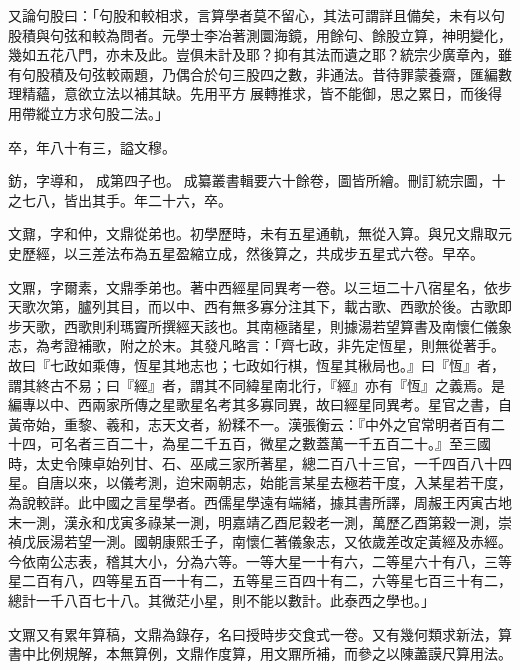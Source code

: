 \begin{pinyinscope}
又論句股曰：「句股和較相求，言算學者莫不留心，其法可謂詳且備矣，未有以句股積與句弦和較為問者。元學士李冶著測圜海鏡，用餘句、餘股立算，神明變化，幾如五花八門，亦未及此。豈俱未計及耶？抑有其法而遺之耶？統宗少廣章內，雖有句股積及句弦較兩題，乃偶合於句三股四之數，非通法。昔待罪蒙養齋，匯編數理精蘊，意欲立法以補其缺。先用平方展轉推求，皆不能御，思之累日，而後得用帶縱立方求句股二法。」

卒，年八十有三，謚文穆。

鈁，字導和，成第四子也。成纂叢書輯要六十餘卷，圖皆所繪。刪訂統宗圖，十之七八，皆出其手。年二十六，卒。

文鼐，字和仲，文鼎從弟也。初學歷時，未有五星通軌，無從入算。與兄文鼎取元史歷經，以三差法布為五星盈縮立成，然後算之，共成步五星式六卷。早卒。

文鼏，字爾素，文鼎季弟也。著中西經星同異考一卷。以三垣二十八宿星名，依步天歌次第，臚列其目，而以中、西有無多寡分注其下，載古歌、西歌於後。古歌即步天歌，西歌則利瑪竇所撰經天該也。其南極諸星，則據湯若望算書及南懷仁儀象志，為考證補歌，附之於末。其發凡略言：「齊七政，非先定恆星，則無從著手。故曰『七政如乘傳，恆星其地志也；七政如行棋，恆星其楸局也。』曰『恆』者，謂其終古不易；曰『經』者，謂其不同緯星南北行，『經』亦有『恆』之義焉。是編專以中、西兩家所傳之星歌星名考其多寡同異，故曰經星同異考。星官之書，自黃帝始，重黎、羲和，志天文者，紛糅不一。漢張衡云：『中外之官常明者百有二十四，可名者三百二十，為星二千五百，微星之數蓋萬一千五百二十。』至三國時，太史令陳卓始列甘、石、巫咸三家所著星，總二百八十三官，一千四百八十四星。自唐以來，以儀考測，迨宋兩朝志，始能言某星去極若干度，入某星若干度，為說較詳。此中國之言星學者。西儒星學遠有端緒，據其書所譯，周赧王丙寅古地末一測，漢永和戊寅多祿某一測，明嘉靖乙酉尼穀老一測，萬歷乙酉第穀一測，崇禎戊辰湯若望一測。國朝康熙壬子，南懷仁著儀象志，又依歲差改定黃經及赤經。今依南公志表，稽其大小，分為六等。一等大星一十有六，二等星六十有八，三等星二百有八，四等星五百一十有二，五等星三百四十有二，六等星七百三十有二，總計一千八百七十八。其微茫小星，則不能以數計。此泰西之學也。」

文鼏又有累年算稿，文鼎為錄存，名曰授時步交食式一卷。又有幾何類求新法，算書中比例規解，本無算例，文鼎作度算，用文鼏所補，而參之以陳藎謨尺算用法。


\end{pinyinscope}
